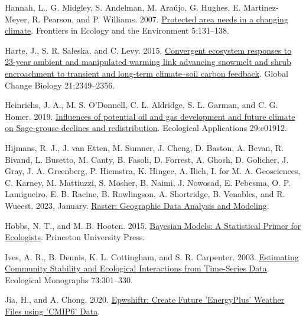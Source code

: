 \documentclass[
  12pt,
]{article}
\newlength{\cslhangindent}
\newlength{\cslentryspacingunit} %
\newenvironment{CSLReferences}[2] %
 {%
  \setlength{\parindent}{0pt}
  \ifodd #1
  \let\oldpar\par
  \def\par{\hangindent=\cslhangindent\oldpar}
  \fi
  \setlength{\parskip}{#2\cslentryspacingunit}
 }%
 {}
\begin{document}
\begin{CSLReferences}{1}{0}
\leavevmode{}%
Hannah, L., G. Midgley, S. Andelman, M. Araújo, G. Hughes, E. Martinez-Meyer, R. Pearson, and P. Williams. 2007. \href{https://doi.org/10.1890/1540-9295(2007)5\%5B131:PANIAC\%5D2.0.CO;2}{Protected area needs in a changing climate}. Frontiers in Ecology and the Environment 5:131--138.

\leavevmode{}%
Harte, J., S. R. Saleska, and C. Levy. 2015. \href{https://doi.org/10.1111/gcb.12831}{Convergent ecosystem responses to 23-year ambient and manipulated warming link advancing snowmelt and shrub encroachment to transient and long-term climate--soil carbon feedback}. Global Change Biology 21:2349--2356.

\leavevmode{}%
Heinrichs, J. A., M. S. O'Donnell, C. L. Aldridge, S. L. Garman, and C. G. Homer. 2019. \href{https://doi.org/10.1002/eap.1912}{Influences of potential oil and gas development and future climate on {Sage}-grouse declines and redistribution}. Ecological Applications 29:e01912.

\leavevmode{}%
Hijmans, R. J., J. van Etten, M. Sumner, J. Cheng, D. Baston, A. Bevan, R. Bivand, L. Busetto, M. Canty, B. Fasoli, D. Forrest, A. Ghosh, D. Golicher, J. Gray, J. A. Greenberg, P. Hiemstra, K. Hingee, A. Ilich, I. for M. A. Geosciences, C. Karney, M. Mattiuzzi, S. Mosher, B. Naimi, J. Nowosad, E. Pebesma, O. P. Lamigueiro, E. B. Racine, B. Rowlingson, A. Shortridge, B. Venables, and R. Wueest. 2023, January. \href{https://CRAN.R-project.org/package=raster}{Raster: {Geographic} {Data} {Analysis} and {Modeling}}.

\leavevmode{}%
Hobbs, N. T., and M. B. Hooten. 2015. \href{https://press.princeton.edu/books/hardcover/9780691159287/bayesian-models}{Bayesian {Models}: {A} {Statistical} {Primer} for {Ecologists}}. Princeton University Press.

\leavevmode{}%
Ives, A. R., B. Dennis, K. L. Cottingham, and S. R. Carpenter. 2003. \href{https://doi.org/10.1890/0012-9615(2003)073\%5B0301:ECSAEI\%5D2.0.CO;2}{Estimating {Community} {Stability} and {Ecological} {Interactions} from {Time}-{Series} {Data}}. Ecological Monographs 73:301--330.

\leavevmode{}%
Jia, H., and A. Chong. 2020. \href{https://CRAN.R-project.org/package=epwshiftr}{Epwshiftr: {Create} {Future} '{EnergyPlus}' {Weather} {Files} using '{CMIP6}' {Data}}.


\end{CSLReferences}
\end{document}
